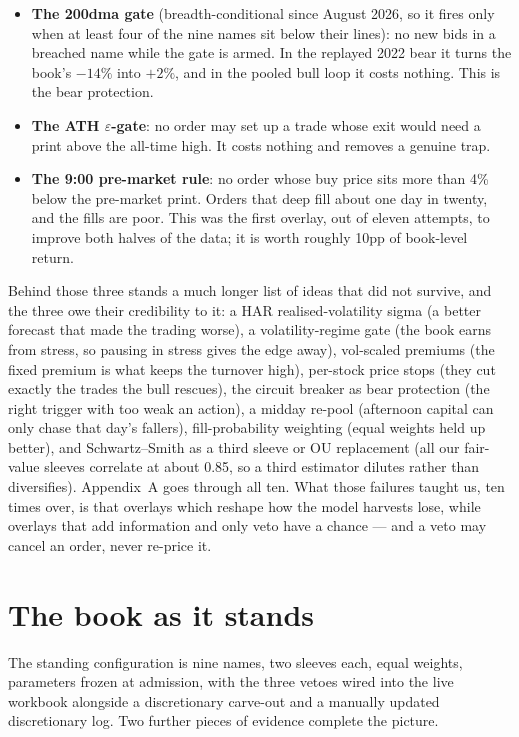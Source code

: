 \documentclass[11pt,a4paper]{article}
\begin{document}
\begin{itemize}
\item \textbf{The 200dma gate} (breadth-conditional since August 2026, so it
fires only when at least four of the nine names sit below their lines): no
new bids in a breached name while the gate is armed. In the replayed 2022
bear it turns the book's $-14\%$ into $+2\%$, and in the pooled bull loop it
costs nothing. This is the bear protection.
\item \textbf{The ATH $\varepsilon$-gate}: no order may set up a trade whose
exit would need a print above the all-time high. It costs nothing and
removes a genuine trap.
\item \textbf{The 9:00 pre-market rule}: no order whose buy price sits more
than 4\% below the pre-market print. Orders that deep fill about one day in
twenty, and the fills are poor. This was the first overlay, out of eleven
attempts, to improve both halves of the data; it is worth roughly 10pp of
book-level return.
\end{itemize}

Behind those three stands a much longer list of ideas that did not survive,
and the three owe their credibility to it: a HAR realised-volatility sigma
(a better forecast that made the trading worse), a volatility-regime gate
(the book earns from stress, so pausing in stress gives the edge away),
vol-scaled premiums (the fixed premium is what keeps the turnover high),
per-stock price stops (they cut exactly the trades the bull rescues), the
circuit breaker as bear protection (the right trigger with too weak an
action), a midday re-pool (afternoon capital can only chase that day's
fallers), fill-probability weighting (equal weights held up better), and
Schwartz--Smith as a third sleeve or OU replacement (all our fair-value
sleeves correlate at about 0.85, so a third estimator dilutes rather than
diversifies). Appendix~A goes through all ten. What those failures taught
us, ten times over, is that overlays which reshape how the model harvests
lose, while overlays that add information and only veto have a chance ---
and a veto may cancel an order, never re-price it.

\section{The book as it stands}

The standing configuration is nine names, two sleeves each, equal weights,
parameters frozen at admission, with the three vetoes wired into the live
workbook alongside a discretionary carve-out and a manually updated
discretionary log. Two further pieces of evidence complete the picture.
\end{document}
